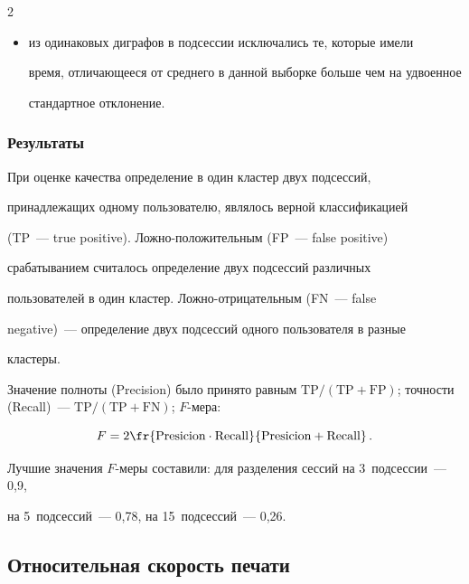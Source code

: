 \begin{multicols}{2}
\begin{enumerate}[(1)]
\begin{itemize}
        удвоенного среднего стандартного отклонения всех диграфов данной подсессии;

        \item[(в)] из одинаковых диграфов в подсессии исключались те, которые имели 

        время, отличающееся от среднего в данной выборке больше чем на удвоенное 

        стандартное отклонение.

    \end{itemize}

\end{enumerate}



\subsubsection{Результаты}



При оценке качества определение в один клас\-тер двух подсессий,

принадлежащих одному пользователю, являлось верной классификацией\linebreak

(TP~--- true positive). Ложно-положительным (FP~--- false positive)

срабатыванием считалось определение двух подсессий различных

пользователей в один кластер. Лож\-но-от\-ри\-ца\-тель\-ным (FN~--- false

negative)~--- определение двух подсессий одного пользователя в разные

кластеры.



Значение полноты (Precision) было принято равным $\mathrm{TP/(TP +

FP)}$; точности (Recall)~--- $\mathrm{TP/(TP + FN)}$; $F$-ме\-ра: 

$$

F= 2  \fr{\text{Presicion} \cdot

\text{Recall}}{\text{Presicion} + \text{Recall}}\,.

$$



Лучшие значения $F$-меры составили: для разделения сессий на 3~подсессии~--- 0,9, 

на 5~подсессий~--- 0,78, на 15~подсессий~--- 0,26.



\subsection{Относительная скорость печати}




\end{multicols}
